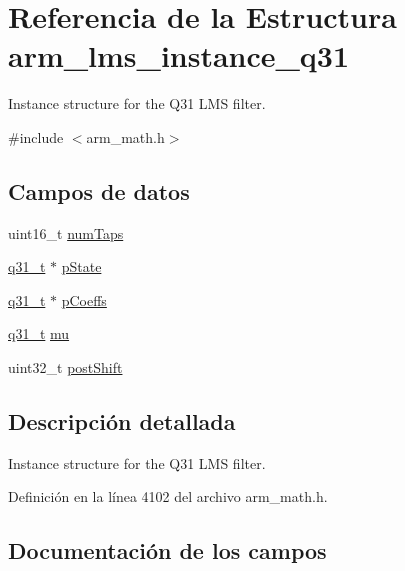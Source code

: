 \hypertarget{structarm__lms__instance__q31}{}\section{Referencia de la Estructura arm\+\_\+lms\+\_\+instance\+\_\+q31}
\label{structarm__lms__instance__q31}


Instance structure for the Q31 L\+MS filter.  




{\ttfamily \#include $<$arm\+\_\+math.\+h$>$}

\subsection*{Campos de datos}
\begin{DoxyCompactItemize}
\item 
uint16\+\_\+t \hyperlink{structarm__lms__instance__q31_a751941891e47f522a7f5375fe8990aac}{num\+Taps}
\item 
\hyperlink{arm__math_8h_adc89a3547f5324b7b3b95adec3806bc0}{q31\+\_\+t} $\ast$ \hyperlink{structarm__lms__instance__q31_adee4ba3ee8869865af7d8fa08ca913d6}{p\+State}
\item 
\hyperlink{arm__math_8h_adc89a3547f5324b7b3b95adec3806bc0}{q31\+\_\+t} $\ast$ \hyperlink{structarm__lms__instance__q31_a68888e36167d81cb7836db10367a1682}{p\+Coeffs}
\item 
\hyperlink{arm__math_8h_adc89a3547f5324b7b3b95adec3806bc0}{q31\+\_\+t} \hyperlink{structarm__lms__instance__q31_a21ab4237a726ea7751f5026d89d2e577}{mu}
\item 
uint32\+\_\+t \hyperlink{structarm__lms__instance__q31_aa2cacddfc5e1d86905d7d31a18b1979b}{post\+Shift}
\end{DoxyCompactItemize}


\subsection{Descripción detallada}
Instance structure for the Q31 L\+MS filter. 

Definición en la línea 4102 del archivo arm\+\_\+math.\+h.



\subsection{Documentación de los campos}
